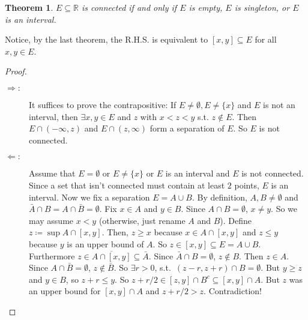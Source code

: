 \documentclass[12pt]{article}
\theoremstyle{plain}
\newtheorem{thm}{Theorem}
\theoremstyle{definition}
\begin{document}
\begin{thm}
    $E\subseteq \mathbb{R}$ is connected if and only if $E$ is empty, $E$ is singleton, or $E$ is an interval.
\end{thm}
    Notice, by the last theorem, the R.H.S. is equivalent to $[x,y]\subseteq E$ for all $x,y\in E$.
\begin{proof}
    \begin{description}
        \item [$\Rightarrow:$]
            It suffices to prove the contrapositive: If $E\neq \emptyset, E\neq\{x\}$ and $E$ is not an interval, then $\exists x,y\in E$ and $z$ with
            $x<z<y$ s.t. $z\notin E$.
            Then $E\cap (-\infty,z)$ and $E\cap (z,\infty)$ form a separation of $E$.
            So $E$ is not connected.
        \item [$\Leftarrow:$]
            Assume that $E = \emptyset $ or $E\neq\{x\}$ or $E$ is an interval and $E$ is not connected.
            Since a set that isn't connected must contain at least $2$ points, $E$ is an interval.
            Now we fix a separation $E=A\cup B$.
            By definition, $A, B\neq \emptyset$ and $\bar{A}\cap B = A\cap\bar{B}=\emptyset$.
            Fix $x\in A$ and $y\in B$.
            Since $A\cap B=\emptyset$, $x\neq y$.
            So we may assume $x<y$ (otherwise, just rename $A$ and $B$).
            Define $z\coloneqq \sup A\cap [x,y]$.
            Then, $z\geq x$ because $x\in A\cap [x,y]$ and $z\leq y$ because $y$ is an upper bound of $A$.
            So $z\in [x,y]\subseteq E = A\cup B$.
            Furthermore $z\in \overline{A\cap [x,y]} \subseteq \bar{A}$.
            Since $\bar{A}\cap B=\emptyset$, $z\notin B$.
            Then $z\in A$.
            Since $A\cap \bar{B}=\emptyset$, $z\notin \bar{B}$.
            So $\exists r>0$, s.t.\ $(z-r,z+r)\cap B=\emptyset$.
            But $y\geq z$ and $y\in B$, so $z+r\leq y$.
            So $z+r/2\in [z,y]\cap B^c\subseteq [x,y]\cap A$.
            But $z$ was an upper bound for $[x,y]\cap A$ and $z+r/2>z$.
            Contradiction!
    \end{description}
\end{proof}
\end{document}
